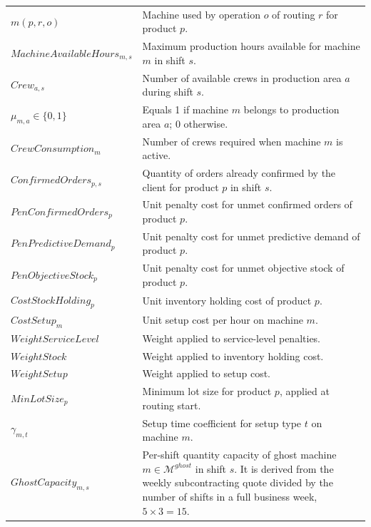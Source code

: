 \documentclass{article}
\begin{document}
\begin{longtable}{@{}L{0.35\textwidth}L{0.59\textwidth}@{}}
$m(p,r,o)$ & Machine used by operation $o$ of routing $r$ for product $p$. \\

$MachineAvailableHours_{m,s}$ & Maximum production hours available for machine $m$ in shift $s$. \\

$Crew_{a,s}$ & Number of available crews in production area $a$ during shift $s$. \\

$\mu_{m,a} \in \{0,1\}$ & Equals 1 if machine $m$ belongs to production area $a$; 0 otherwise. \\

$CrewConsumption_m$ & Number of crews required when machine $m$ is active. \\

$ConfirmedOrders_{p,s}$ & Quantity of orders already confirmed by the client for product $p$ in shift $s$. \\

$PenConfirmedOrders_p$ & Unit penalty cost for unmet confirmed orders of product $p$. \\

$PenPredictiveDemand_p$ & Unit penalty cost for unmet predictive demand of product $p$. \\

$PenObjectiveStock_p$ & Unit penalty cost for unmet objective stock of product $p$. \\

$CostStockHolding_p$ & Unit inventory holding cost of product $p$. \\

$CostSetup_m$ & Unit setup cost per hour on machine $m$. \\

$WeightServiceLevel$ & Weight applied to service-level penalties. \\

$WeightStock$ & Weight applied to inventory holding cost. \\

$WeightSetup$ & Weight applied to setup cost. \\

$MinLotSize_p$ & Minimum lot size for product $p$, applied at routing start. \\

$\gamma_{m,t}$ & Setup time coefficient for setup type $t$ on machine $m$. \\

$GhostCapacity_{m,s}$ & Per-shift quantity capacity of ghost machine $m \in \mathcal{M}^{ghost}$ in shift $s$. It is derived from the weekly subcontracting quote divided by the number of shifts in a full business week, $5 \times 3 = 15$. \\


\end{longtable}
\end{document}
